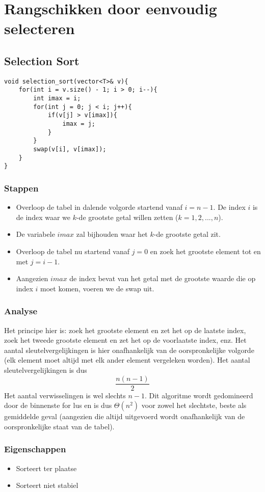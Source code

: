 \documentclass{report}
\begin{document}
\section{Rangschikken door eenvoudig selecteren}
\subsection{Selection Sort}
\begin{lstlisting}
void selection_sort(vector<T>& v){
    for(int i = v.size() - 1; i > 0; i--){
        int imax = i;
        for(int j = 0; j < i; j++){
            if(v[j] > v[imax]){
                imax = j;
            }
        }
        swap(v[i], v[imax]);
    }
}
\end{lstlisting}
\subsubsection{Stappen}
\begin{itemize}
 \item Overloop de tabel in dalende volgorde startend vanaf $i = n - 1$. De index $i$ is de index waar we $k$-de grootste getal willen zetten ($k = 1, 2, ..., n$).
 \item De variabele $imax$ zal bijhouden waar het $k$-de grootste getal zit.
 \item Overloop de tabel nu startend vanaf $j = 0$ en zoek het grootste element tot en met $j = i -1$.
 \item Aangezien $imax$ de index bevat van het getal met de grootste waarde die op index $i$ moet komen, voeren we de swap uit.
\end{itemize}
\subsubsection{Analyse}
Het principe hier is: zoek het grootste element en zet het op de laatste index, zoek het tweede grootste element en zet het op de voorlaatste index, enz. Het aantal sleutelvergelijkingen is hier onafhankelijk van de oorspronkelijke volgorde (elk element moet altijd met elk ander element vergeleken worden). Het aantal sleutelvergelijkingen is dus 
$$\frac{n(n - 1)}{2}$$
Het aantal verwisselingen is wel slechts $n - 1$. Dit algoritme wordt gedomineerd door de binnenste for lus en is dus $\Theta(n^2)$ voor zowel het slechtste, beste als gemiddelde geval (aangezien die altijd uitgevoerd wordt onafhankelijk van de oorspronkelijke staat van de tabel).
\subsubsection{Eigenschappen}
\begin{itemize}
 \item Sorteert ter plaatse
 \item Sorteert niet stabiel
\end{itemize}
\end{document}
